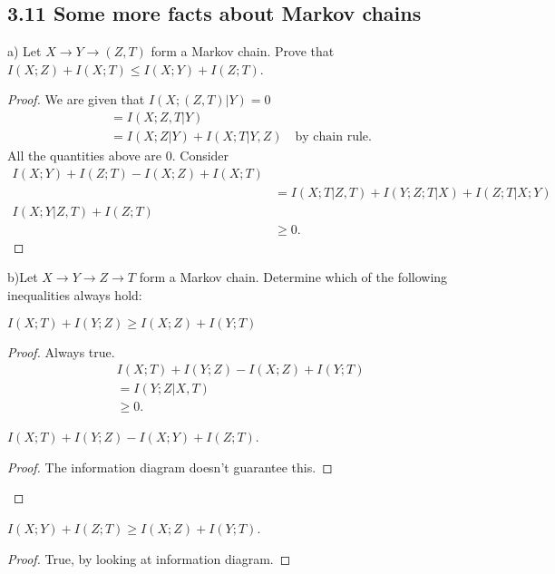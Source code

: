 \documentclass[../main.tex]{subfiles}
\begin{document}
 \subsection*{3.11 Some more facts about Markov chains}
 a) Let $X\to Y\to (Z,T)$ form a Markov chain. Prove that $I(X;Z)+I(X;T)\leq I(X;Y)+I(Z;T)$.
 \begin{proof}

 We are given that $I(X;(Z,T)|Y)=0$\begin{align*}
     &=I(X;Z,T|Y)\\
     &= I(X;Z|Y)+I(X;T|Y,Z)\quad \text{by chain rule}.
 \end{align*} All the quantities above are $0$. Consider
     \begin{align*}
         I(X;Y)+I(Z;T)-I(X;Z)+I(X;T)\\
         &= I(X;T|Z,T)+I(Y;Z;T|X)+I(Z;T|X;Y)\\
         I(X;Y|Z,T)+I(Z;T)\\
         &\geq 0.
     \end{align*}
 \end{proof}
 b)Let $X\to Y\to Z\to T$ form a Markov chain. Determine which of the following inequalities always hold:
 \begin{itemize}
     \item $I(X;T) + I(Y;Z)\geq I(X;Z) + I(Y;T)$\begin{proof}
         Always true.\begin{align*}
             &I(X;T)+I(Y;Z)-I(X;Z)+I(Y;T)\\
             &=I(Y;Z|X,T)\\
             &\geq 0.
         \end{align*}
         \item $I(X;T)+I(Y;Z)-I(X;Y)+I(Z;T)$.\begin{proof}
             The information diagram doesn't guarantee this.
         \end{proof}
     \end{proof}
     \item $I(X; Y) + I(Z; T) \geq I(X; Z) + I(Y; T)$.\begin{proof}
         True, by looking at information diagram.
     \end{proof}
 \end{itemize}
\end{document}
